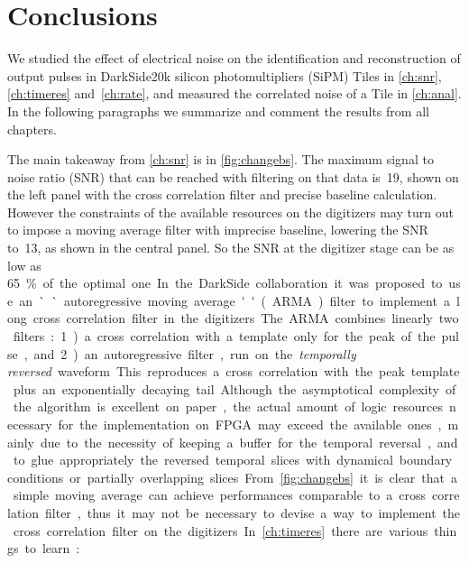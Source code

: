 \chapter{Conclusions}
\label{ch:end}

We studied the effect of electrical noise on the identification and
reconstruction of output pulses in DarkSide20k silicon photomultipliers (SiPM)
Tiles in \autoref{ch:snr}, \ref{ch:timeres} and~\ref{ch:rate}, and measured the
correlated noise of a Tile in \autoref{ch:anal}. In the following paragraphs we
summarize and comment the results from all chapters.

The main takeaway from \autoref{ch:snr} is in \autoref{fig:changebs}. The
maximum signal to noise ratio (SNR) that can be reached with filtering on that
data is~19, shown on the left panel with the cross correlation filter and
precise baseline calculation. However the constraints of the available
resources on the digitizers may turn out to impose a moving average filter with
imprecise baseline, lowering the SNR to~13, as shown in the central panel. So
the SNR at the digitizer stage can be as low as \SI{65}\% of the optimal one.

In the DarkSide collaboration it was proposed to use an ``autoregressive moving
average'' (ARMA) filter to implement a long cross correlation filter in the
digitizers. The ARMA combines linearly two filters: 1)~a cross correlation with
a template only for the peak of the pulse, and 2)~an autoregressive filter, run
on the \emph{temporally reversed} waveform. This reproduces a cross correlation
with the peak template plus an exponentially decaying tail. Although the
asymptotical complexity of the algorithm is excellent on paper, the actual
amount of logic resources necessary for the implementation on FPGA may exceed
the available ones, mainly due to the necessity of keeping a buffer for the
temporal reversal, and to glue appropriately the reversed temporal slices with
dynamical boundary conditions or partially overlapping slices. From
\autoref{fig:changebs} it is clear that a simple moving average can achieve
performances comparable to a cross correlation filter, thus it may not be
necessary to devise a way to implement the cross correlation filter on the
digitizers.

In \autoref{ch:timeres} there are various things to learn:

